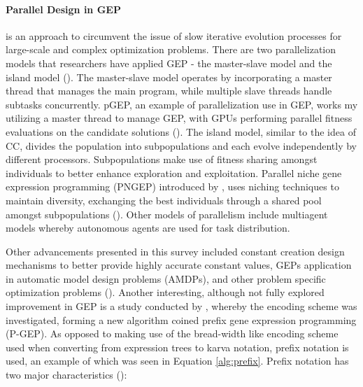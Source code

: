 \noindent \paragraph{Parallel Design in GEP} is an approach to circumvent the issue of slow iterative evolution processes for large-scale and complex optimization problems. There are two parallelization models that researchers have applied GEP - the master-slave model and the island model (\cite{zhong2017gene}). The master-slave model operates by incorporating a master thread that manages the main program, while multiple slave threads handle subtasks concurrently. pGEP, an example of parallelization use in GEP, works my utilizing a master thread to manage GEP, with GPUs performing parallel fitness evaluations on the candidate solutions (\cite{zhong2017gene}). The island model, similar to the idea of CC, divides the population into subpopulations and each evolve independently by different processors. Subpopulations make use of fitness sharing amongst individuals to better enhance exploration and exploitation. Parallel niche gene expression programming (PNGEP) introduced by \cite{li2005prefix}, uses niching techniques to maintain  diversity, exchanging the best individuals through a shared pool amongst subpopulations (\cite{zhong2017gene}). Other models of parallelism include multiagent models whereby autonomous agents are used for task distribution. \bigskip

\noindent Other advancements presented in this survey included constant creation design mechanisms to better provide highly accurate constant values, GEPs application in automatic model design problems (AMDPs), and other problem specific optimization problems (\cite{zhong2017gene}). Another interesting, although not fully explored improvement in GEP is a study conducted by \cite{li2005prefix}, whereby the encoding scheme was investigated, forming a new algorithm coined prefix gene expression programming (P-GEP). As opposed to making use of the bread-width like encoding scheme used when converting from expression trees to karva notation, prefix notation is used, an example of which was seen in Equation \ref{alg:prefix}. Prefix notation has two major characteristics (\cite{li2005prefix}):

